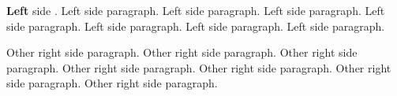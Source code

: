 \documentclass{article}
\begin{document}
        \beginnumbering
       
            \pstart
                \textbf{Left} side . Left side paragraph. Left side paragraph. Left side paragraph. Left side paragraph. Left side paragraph. Left side paragraph. Left side paragraph. 
            \pend



            \pstart
                Other right side paragraph.  Other right side paragraph. Other right side paragraph. Other right side paragraph. Other right side paragraph. Other right side paragraph. Other right side paragraph.
            \pend
        \endnumbering


\end{document}
